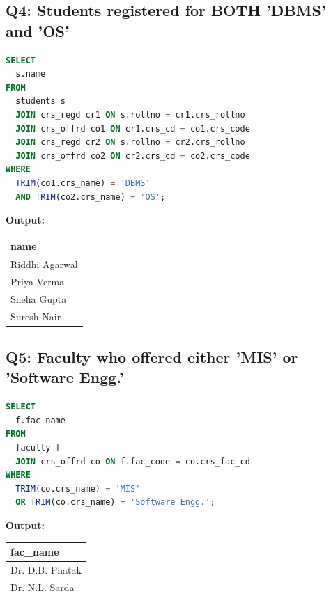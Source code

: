 \documentclass[11pt, a4paper]{article}
\begin{document}
\subsection*{Q4: Students registered for BOTH 'DBMS' and 'OS'}
\begin{lstlisting}[language=SQL]
SELECT
  s.name
FROM
  students s
  JOIN crs_regd cr1 ON s.rollno = cr1.crs_rollno
  JOIN crs_offrd co1 ON cr1.crs_cd = co1.crs_code
  JOIN crs_regd cr2 ON s.rollno = cr2.crs_rollno
  JOIN crs_offrd co2 ON cr2.crs_cd = co2.crs_code
WHERE
  TRIM(co1.crs_name) = 'DBMS'
  AND TRIM(co2.crs_name) = 'OS';
\end{lstlisting}
\vspace{0.3cm}
\textbf{Output:}\vspace{0.2cm}
\begin{center}
\begin{tabular}{|l|}
\hline
\textbf{name} \\ \hline
Riddhi Agarwal                 \\ \hline
Priya Verma                    \\ \hline
Sneha Gupta                    \\ \hline
Suresh Nair                    \\ \hline
\end{tabular}
\end{center}
\newpage
\subsection*{Q5: Faculty who offered either 'MIS' or 'Software Engg.'}
\begin{lstlisting}[language=SQL]
SELECT
  f.fac_name
FROM
  faculty f
  JOIN crs_offrd co ON f.fac_code = co.crs_fac_cd
WHERE
  TRIM(co.crs_name) = 'MIS'
  OR TRIM(co.crs_name) = 'Software Engg.';
\end{lstlisting}
\vspace{0.3cm}
\textbf{Output:}\vspace{0.2cm}
\begin{center}
\begin{tabular}{|l|}
\hline
\textbf{fac\_name} \\ \hline
Dr. D.B. Phatak                \\ \hline
Dr. N.L. Sarda                 \\ \hline
\end{tabular}
\end{center}
\newpage
\end{document}
